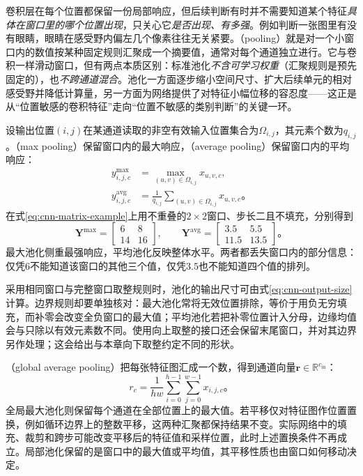 卷积层在每个位置都保留一份局部响应，但后续判断有时并不需要知道某个特征\emph{具体在窗口里的哪个位置出现}，只关心它\emph{是否出现、有多强}。例如判断一张图里有没有眼睛，眼睛在感受野内偏左几个像素往往无关紧要。（pooling）就是对一个小窗口内的数值按某种固定规则汇聚成一个摘要值，通常对每个通道独立进行。它与卷积一样滑动窗口，但有两点本质区别：标准池化\emph{不含可学习权重}（汇聚规则是预先固定的），也\emph{不跨通道混合}。池化一方面逐步缩小空间尺寸、扩大后续单元的相对感受野并降低计算量，另一方面为网络提供了对特征小幅位移的容忍度——这正是从“位置敏感的卷积特征”走向“位置不敏感的类别判断”的关键一环。

设输出位置$(i,j)$在某通道读取的非空有效输入位置集合为$\Omega_{i,j}$，其元素个数为$q_{i,j}$。（max pooling）保留窗口内的最大响应，（average pooling）保留窗口内的平均响应：
\begin{equation}
  \begin{aligned}
    y_{i,j,c}^{\mathrm{max}}&=\max_{(u,v)\in\Omega_{i,j}}x_{u,v,c},\\
    y_{i,j,c}^{\mathrm{avg}}&=\frac1{q_{i,j}}
                   \sum_{(u,v)\in\Omega_{i,j}}x_{u,v,c}\text{。}
  \end{aligned}
  \label{eq:cnn-local-pooling}
\end{equation}
在式\eqref{eq:cnn-matrix-example}上用不重叠的$2\times2$窗口、步长二且不填充，分别得到
\begin{equation}
  \bm Y^{\mathrm{max}}=\begin{bmatrix}6&8\\14&16\end{bmatrix},\qquad
  \bm Y^{\mathrm{avg}}=\begin{bmatrix}3.5&5.5\\11.5&13.5\end{bmatrix}\text{。}
  \label{eq:cnn-pooling-example}
\end{equation}
最大池化侧重最强响应，平均池化反映整体水平。两者都丢失窗口内的部分信息：仅凭$6$不能知道该窗口的其他三个值，仅凭$3.5$也不能知道四个值的排列。

采用相同窗口与完整窗口取整规则时，池化的输出尺寸可由式\eqref{eq:cnn-output-size}计算。边界规则却要单独核对：最大池化常将无效位置排除，等价于用负无穷填充，而补零会改变全负窗口的最大值；平均池化若把补零位置计入分母，边缘均值会与只除以有效元素数不同。使用向上取整的接口还会保留末尾窗口，并对其边界另作处理；这会给出与本章向下取整约定不同的形状。

（global average pooling）把每张特征图汇成一个数，得到通道向量$\bm r\in\mathbb R^{c_{\mathrm{in}}}$：
\begin{equation}
  r_c=\frac1{hw}\sum_{i=0}^{h-1}\sum_{j=0}^{w-1}x_{i,j,c}\text{。}
  \label{eq:cnn-global-average-pooling}
\end{equation}
全局最大池化则保留每个通道在全部位置上的最大值。若平移仅对特征图作位置置换，例如循环边界上的整数平移，这两种汇聚都保持结果不变。实际网络中的填充、裁剪和跨步可能改变平移后的特征值和采样位置，此时上述置换条件不再成立。局部池化保留的是窗口中的最大值或平均值，其平移性质也由窗口如何移动决定。

